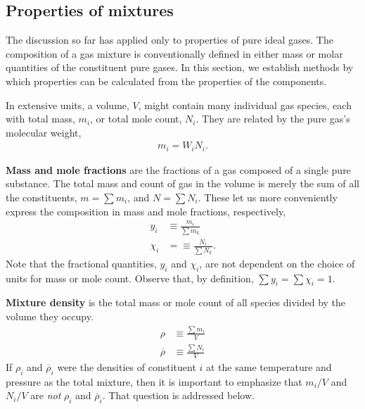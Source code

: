 \subsection{Properties of mixtures}\label{sec:ig:mix}

The discussion so far has applied only to properties of pure ideal gases.  The composition of a gas mixture is conventionally defined in either mass or molar quantities of the constituent pure gases.  In this section, we establish methods by which properties can be calculated from the properties of the components.  

In extensive units, a volume, $V$, might contain many individual gas species, each with total mass, $m_i$, or total mole count, $N_i$.  They are related by the pure gas's molecular weight,
\begin{align}
m_i = W_i N_i.
\end{align}

{\bf Mass and mole fractions} are the fractions of a gas composed of a single pure substance. The total mass and count of gas in the volume is merely the sum of all the constituents, $m = \sum m_i$, and $N = \sum N_i$.  These let us more conveniently express the composition in mass and mole fractions, respectively,
\begin{subequations}
\begin{align}
y_i &\equiv \frac{m_i}{\sum m_k}\\
\chi_i &= \equiv \frac{N_i}{\sum N_k}.
\end{align}
\end{subequations}
Note that the fractional quantities, $y_i$ and $\chi_i$, are not dependent on the choice of units for mass or mole count.  Observe that, by definition, $\sum y_i = \sum \chi_i = 1$.

{\bf Mixture density} is the total mass or mole count of all species divided by the volume they occupy.  
\begin{subequations}
\begin{align}
\rho &\equiv \frac{\sum m_i}{V}\\
\overline{\rho} &\equiv \frac{\sum N_i}{V}
\end{align}
\end{subequations}
If $\rho_i$ and $\overline{\rho}_i$ were the densities of constituent $i$ at the same temperature and pressure as the total mixture, then it is important to emphasize that $m_i / V$  and $N_i / V$ are \emph{not} $\rho_i$ and $\overline{\rho}_i$.  That question is addressed below.

